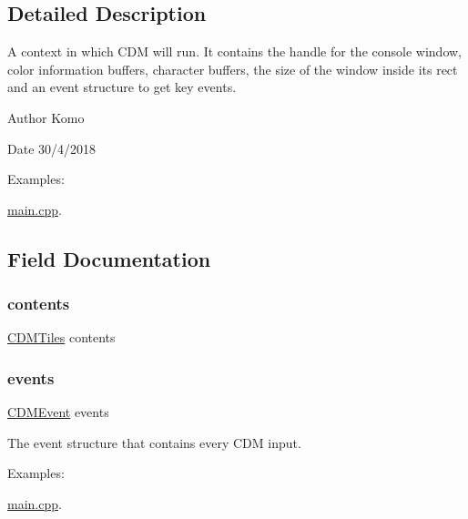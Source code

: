 \subsection{Detailed Description}
A context in which C\+DM will run. It contains the handle for the console window, color information buffers, character buffers, the size of the window inside it\textquotesingle{}s rect and an event structure to get key events. 

\begin{DoxyAuthor}{Author}
Komo 
\end{DoxyAuthor}
\begin{DoxyDate}{Date}
30/4/2018 
\end{DoxyDate}
\begin{Desc}
\item[Examples\+: ]\par
\mbox{\hyperlink{main_8cpp-example}{main.\+cpp}}.\end{Desc}


\subsection{Field Documentation}
\mbox{\label{struct_c_d_m_context_ac8c52228a53211702c5785f9c82e2f83}} 
\subsubsection{\texorpdfstring{contents}{contents}}
{\footnotesize\ttfamily \mbox{\hyperlink{struct_c_d_m_tiles}{C\+D\+M\+Tiles}} contents}

\mbox{\label{struct_c_d_m_context_ab97a0f3b9d5615487c4e542601499e94}} 
\subsubsection{\texorpdfstring{events}{events}}
{\footnotesize\ttfamily \mbox{\hyperlink{struct_c_d_m_event}{C\+D\+M\+Event}} events}



The event structure that contains every C\+DM input. 

\begin{Desc}
\item[Examples\+: ]\par
\mbox{\hyperlink{main_8cpp-example}{main.\+cpp}}.\end{Desc}
\mbox{\label{struct_c_d_m_context_a8476715d51a87d0e92e46b9be0ecd138}} 
